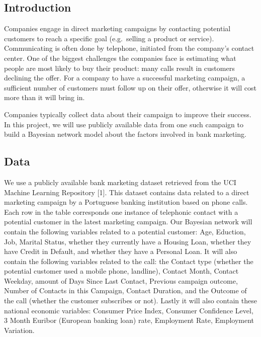 \documentclass[11pt,]{article}
\begin{document}
\begin{multicols}{2}
\tableofcontents

\hypertarget{introduction}{%
\section{Introduction}\label{introduction}}

Companies engage in direct marketing campaigns by contacting potential
customers to reach a specific goal (e.g.~selling a product or service).
Communicating is often done by telephone, initiated from the company's
contact center. One of the biggest challenges the companies face is
estimating what people are most likely to buy their product: many calls
result in customers declining the offer. For a company to have a
successful marketing campaign, a sufficient number of customers must
follow up on their offer, otherwise it will cost more than it will bring
in.

Companies typically collect data about their campaign to improve their
success. In this project, we will use publicly available data from one
such campaign to build a Bayesian network model about the factors
involved in bank marketing.

\hypertarget{data}{%
\subsection{Data}\label{data}}

We use a publicly available bank marketing dataset retrieved from the
UCI Machine Learning Repository {[}1{]}. This dataset contains data
related to a direct marketing campaign by a Portuguese banking
institution based on phone calls. Each row in the table corresponds one
instance of telephonic contact with a potential customer in the latest
marketing campaign. Our Bayesian network will contain the following
variables related to a potential customer: Age, Eduction, Job, Marital
Status, whether they currently have a Housing Loan, whether they have
Credit in Default, and whether they have a Personal Loan. It will also
contain the following variables related to the call: the Contact type
(whether the potential customer used a mobile phone, landline), Contact
Month, Contact Weekday, amount of Days Since Last Contact, Previous
campaign outcome, Number of Contacts in this Campaign, Contact Duration,
and the Outcome of the call (whether the customer subscribes or not).
Lastly it will also contain these national economic variables: Consumer
Price Index, Consumer Confidence Level, 3 Month Euribor (European
banking loan) rate, Employment Rate, Employment Variation.


\end{multicols}
\end{document}
